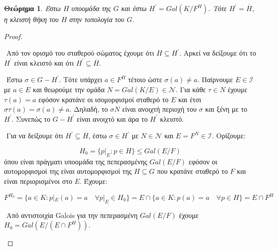 \documentclass[oneside,a4paper]{article}
\newtheorem{theorem}{Θεώρημα}
\newcommand {\tl}{\textlatin}
\begin{document}
\begin{theorem}Έστω $H$ υποομάδα της $G$ και έστω $H^{\prime} = Gal(K/F^H)$. Τότε $H^{\prime} = \overline{H}$, η κλειστή θήκη του $H$ στην τοπολογία του $G$.
\end{theorem}
\begin{proof} $ $


$ $\newline
Από τον ορισμό του σταθερού σώματος έχουμε ότι $H \subseteq H^{\prime}$. Αρκεί να δείξουμε ότι το $H^{\prime}$ είναι κλειστό και ότι $H^{\prime} \subseteq \overline H$. 

$ $\newline
\noindent Έστω $\sigma \in G - H^{\prime}$. Τότε υπάρχει $a \in F^H$ τέτοιο ώστε $\sigma (a) \neq a$. Παίρνουμε $E \in \mathcal{I}$ με $a \in E$ και θεωρούμε την ομάδα $N = Gal(K/E) \in \mathcal{N}$. Για κάθε $\tau \in N$ έχουμε $\tau (a) = a$ εφόσον κρατάνε οι ισομορφισμοί σταθερό το $E$ και έτσι $\sigma \tau (a) = \sigma (a) \neq a$. Δηλαδή, το $\sigma N$ είναι ανοιχτή περιοχή του $\sigma$ και ξένη με το $H^{\prime}$. Συνεπώς το $G - H^{\prime}$ είναι ανοιχτό και άρα το $H^{\prime}$ κλειστό. 

$ $\newline
\noindent Για να δείξουμε ότι $H^{\prime} \subseteq \overline H$, έστω $\sigma \in H^{\prime}$ με $N \in \mathcal{N}$ και $E = F^N \in \mathcal{I}$. Ορίζουμε:

$$H_0 = \{p|_E : p \in H\} \leq Gal(E/F)$$
όπου είναι πράγματι υποομάδα της πεπερασμένης $Gal(E/F)$ εφόσον οι αυτομορφισμοί της είναι αυτομορφισμοί της $H \subseteq G$ που κρατάνε σταθερό το $F$ και είναι περιορισμένοι στο $E$.
Έχουμε:

$$F^{H_0} = \{ a \in K : p|_E (a) = a \quad\forall p|_E \in H_0\}= E \cap \{a 
\in K : p (a) = a \quad\forall  p \in H\}= E \cap F^H$$

$ $\newline
Από αντιστοιχία \tl{Galois} για την πεπερασμένη $Gal(E/F)$ έχουμε $H_0 = Gal(E/(E\cap F^H))$.
\begin{center}
\end{center}


\end{proof}
\end{document}
